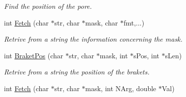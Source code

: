 \begin{DoxyCompactItemize}
\begin{DoxyCompactList}\small\item\em \-Find the position of the pore. \end{DoxyCompactList}\item 
\hypertarget{classVarData_a795f774737c0deac9dfac3edb068526e}{int \hyperlink{classVarData_a795f774737c0deac9dfac3edb068526e}{\-Fetch} (char $\ast$str, char $\ast$mask, char $\ast$fmt,...)}\label{classVarData_a795f774737c0deac9dfac3edb068526e}

\begin{DoxyCompactList}\small\item\em \-Retrive from a string the information concerning the mask. \end{DoxyCompactList}\item 
\hypertarget{classVarData_a57563378ffd76c20068f612fbec29e3d}{int \hyperlink{classVarData_a57563378ffd76c20068f612fbec29e3d}{\-Braket\-Pos} (char $\ast$str, char $\ast$mask, int $\ast$s\-Pos, int $\ast$s\-Len)}\label{classVarData_a57563378ffd76c20068f612fbec29e3d}

\begin{DoxyCompactList}\small\item\em \-Retrive from a string the position of the brakets. \end{DoxyCompactList}\item 
\hypertarget{classVarData_a05ab100c879ea5377012188f65db69b1}{int \hyperlink{classVarData_a05ab100c879ea5377012188f65db69b1}{\-Fetch} (char $\ast$str, char $\ast$mask, int \-N\-Arg, double $\ast$\-Val)}\label{classVarData_a05ab100c879ea5377012188f65db69b1}


\end{DoxyCompactItemize}
